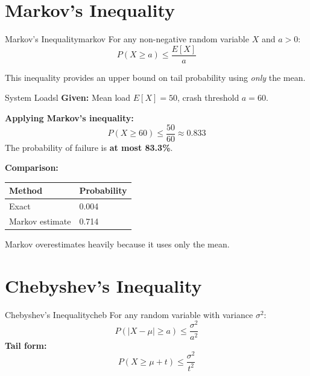 \documentclass[12pt, a4paper]{article}
\newcommand{\EX}[1]{E\!\left[#1\right]}
\begin{document}
\section{Markov's Inequality}

\begin{thm}{Markov's Inequality}{markov}
  For any non-negative random variable $X$ and $a > 0$:
  \[
    P(X \geq a) \leq \frac{\EX{X}}{a}
  \]
\end{thm}

This inequality provides an upper bound on tail probability using \emph{only} the mean.

\begin{exmp}{System Load}{sl}
  \textbf{Given:} Mean load $\EX{X} = 50$, crash threshold $a = 60$.

  \textbf{Applying Markov's inequality:}
  \[
    P(X \geq 60) \leq \frac{50}{60} \approx 0.833
  \]
  The probability of failure is \textbf{at most 83.3\%}.
\end{exmp}

\medskip
\textbf{Comparison:}
\begin{center}
\begin{tabular}{ll}
  \toprule
  \textbf{Method}  & \textbf{Probability} \\
  \midrule
  Exact            & 0.004  \\
  Markov estimate  & 0.714  \\
  \bottomrule
\end{tabular}
\end{center}

Markov overestimates heavily because it uses only the mean.

\section{Chebyshev's Inequality}

\begin{thm}{Chebyshev's Inequality}{cheb}
  For any random variable with variance $\sigma^2$:
  \[
    P\!\left(|X - \mu| \geq a\right) \leq \frac{\sigma^2}{a^2}
  \]
  \textbf{Tail form:}
  \[
    P(X \geq \mu + t) \leq \frac{\sigma^2}{t^2}
  \]
\end{thm}
\end{document}
